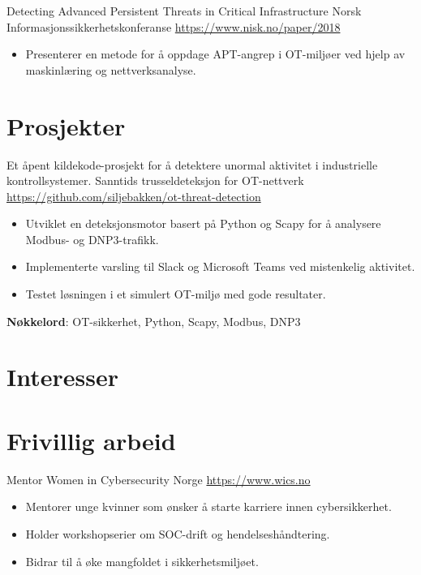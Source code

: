 \documentclass[a4paper, serif, 10pt]{moderncv}
\begin{document}
        {Detecting Advanced Persistent Threats in Critical Infrastructure}
        {Norsk Informasjonssikkerhetskonferanse}
        {\url{https://www.nisk.no/paper/2018}}
        {}
        {\begin{itemize}
\item Presenterer en metode for å oppdage APT-angrep i OT-miljøer ved hjelp av maskinlæring og nettverksanalyse.
\end{itemize}}
\section{Prosjekter}

        {Et åpent kildekode-prosjekt for å detektere unormal aktivitet i industrielle kontrollsystemer.}
        {Sanntids trusseldeteksjon for OT-nettverk}
        {\url{https://github.com/siljebakken/ot-threat-detection}}
        {}
        {\begin{itemize}
\item Utviklet en deteksjonsmotor basert på Python og Scapy for å analysere Modbus- og DNP3-trafikk.
\item Implementerte varsling til Slack og Microsoft Teams ved mistenkelig aktivitet.
\item Testet løsningen i et simulert OT-miljø med gode resultater.
\end{itemize}
\textbf{Nøkkelord}: OT-sikkerhet, Python, Scapy, Modbus, DNP3}
\section{Interesser}

\section{Frivillig arbeid}

        {Mentor}
        {Women in Cybersecurity Norge}
        {\url{https://www.wics.no}}
        {}
        {\begin{itemize}
\item Mentorer unge kvinner som ønsker å starte karriere innen cybersikkerhet.
\item Holder workshopserier om SOC-drift og hendelseshåndtering.
\item Bidrar til å øke mangfoldet i sikkerhetsmiljøet.
\end{itemize}}
    
\end{document}
